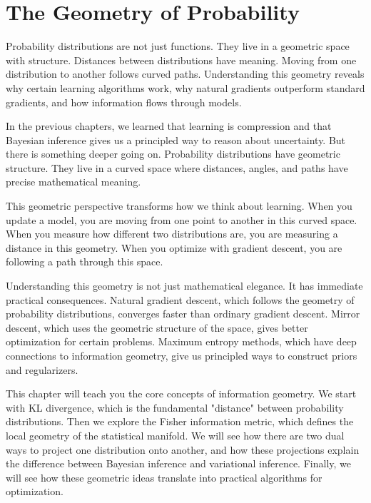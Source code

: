 
\chapter{The Geometry of Probability}

\begin{keyinsight}
Probability distributions are not just functions. They live in a geometric space with structure. Distances between distributions have meaning. Moving from one distribution to another follows curved paths. Understanding this geometry reveals why certain learning algorithms work, why natural gradients outperform standard gradients, and how information flows through models.
\end{keyinsight}

\vspace{1.5em}

In the previous chapters, we learned that learning is compression and that Bayesian inference gives us a principled way to reason about uncertainty. But there is something deeper going on. Probability distributions have geometric structure. They live in a curved space where distances, angles, and paths have precise mathematical meaning.

This geometric perspective transforms how we think about learning. When you update a model, you are moving from one point to another in this curved space. When you measure how different two distributions are, you are measuring a distance in this geometry. When you optimize with gradient descent, you are following a path through this space.

Understanding this geometry is not just mathematical elegance. It has immediate practical consequences. Natural gradient descent, which follows the geometry of probability distributions, converges faster than ordinary gradient descent. Mirror descent, which uses the geometric structure of the space, gives better optimization for certain problems. Maximum entropy methods, which have deep connections to information geometry, give us principled ways to construct priors and regularizers.

This chapter will teach you the core concepts of information geometry. We start with KL divergence, which is the fundamental "distance" between probability distributions. Then we explore the Fisher information metric, which defines the local geometry of the statistical manifold. We will see how there are two dual ways to project one distribution onto another, and how these projections explain the difference between Bayesian inference and variational inference. Finally, we will see how these geometric ideas translate into practical algorithms for optimization.

